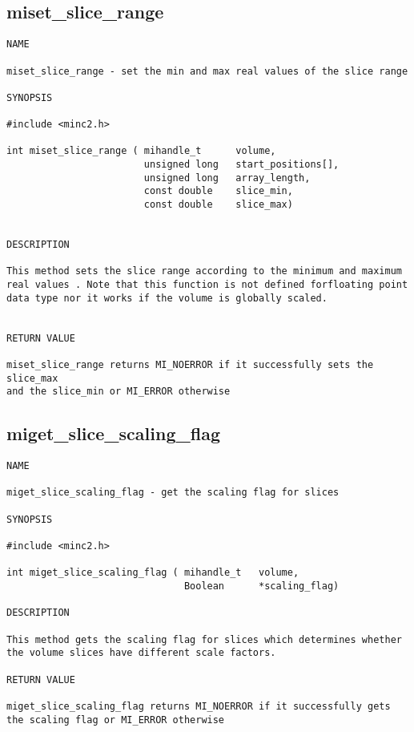 \documentclass{article}
\begin{document}
\subsection{miset\_slice\_range}
\begin{verbatim}
NAME 

miset_slice_range - set the min and max real values of the slice range

SYNOPSIS

#include <minc2.h>

int miset_slice_range ( mihandle_t      volume,
                        unsigned long   start_positions[],
                        unsigned long   array_length,
                        const double    slice_min,
                        const double    slice_max)
                       
                                
DESCRIPTION

This method sets the slice range according to the minimum and maximum
real values . Note that this function is not defined forfloating point 
data type nor it works if the volume is globally scaled.


RETURN VALUE

miset_slice_range returns MI_NOERROR if it successfully sets the slice_max
and the slice_min or MI_ERROR otherwise
\end{verbatim}

\subsection{miget\_slice\_scaling\_flag}
\begin{verbatim}
NAME 

miget_slice_scaling_flag - get the scaling flag for slices

SYNOPSIS

#include <minc2.h>

int miget_slice_scaling_flag ( mihandle_t   volume,
                               Boolean      *scaling_flag)
                                
DESCRIPTION

This method gets the scaling flag for slices which determines whether 
the volume slices have different scale factors. 

RETURN VALUE

miget_slice_scaling_flag returns MI_NOERROR if it successfully gets 
the scaling flag or MI_ERROR otherwise
\end{verbatim}
\end{document}
